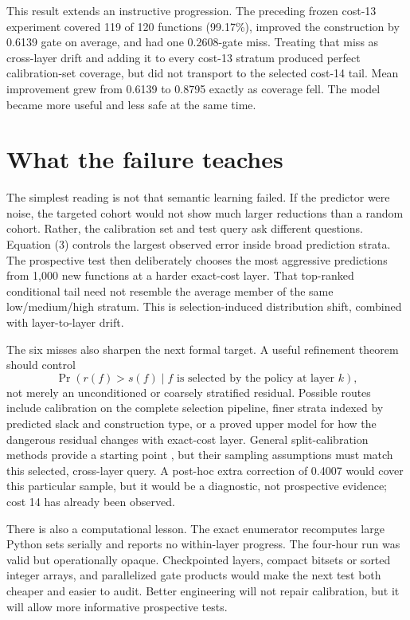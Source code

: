 \documentclass[11pt]{article}
\begin{document}
This result extends an instructive progression.  The preceding frozen
cost-13 experiment covered 119 of 120 functions (99.17\%), improved the
construction by 0.6139 gate on average, and had one 0.2608-gate miss.  Treating
that miss as cross-layer drift and adding it to every cost-13 stratum produced
perfect calibration-set coverage, but did not transport to the selected
cost-14 tail.  Mean improvement grew from 0.6139 to 0.8795 exactly as coverage
fell.  The model became more useful and less safe at the same time.

\section{What the failure teaches}

The simplest reading is not that semantic learning failed.  If the predictor
were noise, the targeted cohort would not show much larger reductions than a
random cohort.  Rather, the calibration set and test query ask different
questions.  Equation (3) controls the largest observed error inside broad
prediction strata.  The prospective test then deliberately chooses the most
aggressive predictions from 1,000 new functions at a harder exact-cost layer.
That top-ranked conditional tail need not resemble the average member of the
same low/medium/high stratum.  This is selection-induced distribution shift,
combined with layer-to-layer drift.

The six misses also sharpen the next formal target.  A useful refinement
theorem should control
\[
 \Pr\!\left(r(f)>s(f)\mid f\text{ is selected by the policy at layer }k\right),
\]
not merely an unconditioned or coarsely stratified residual.  Possible routes
include calibration on the complete selection pipeline, finer strata indexed
by predicted slack and construction type, or a proved upper model for how the
dangerous residual changes with exact-cost layer.  General split-calibration
methods provide a starting point \cite{vovk2005,lei2018}, but their sampling
assumptions must match this selected, cross-layer query.  A post-hoc extra correction
of 0.4007 would cover this particular sample, but it would be a diagnostic,
not prospective evidence; cost 14 has already been observed.

There is also a computational lesson.  The exact enumerator recomputes large
Python sets serially and reports no within-layer progress.  The four-hour run
was valid but operationally opaque.  Checkpointed layers, compact bitsets or
sorted integer arrays, and parallelized gate products would make the next
test both cheaper and easier to audit.  Better engineering will not repair
calibration, but it will allow more informative prospective tests.
\end{document}
